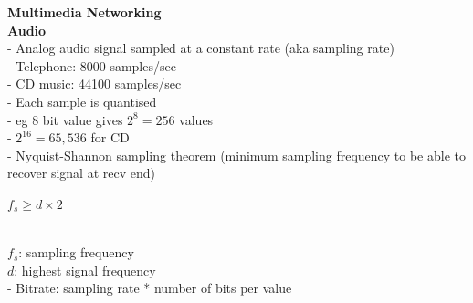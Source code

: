 \documentclass[10pt, a4paper]{article}
\newcommand{\tab}[0]{\hspace*{2mm}}
\begin{document}
\begin{multicols*}{3}
		{\normalsize\textbf{Multimedia Networking}}\\

		\textbf{Audio}\\
		- Analog audio signal sampled at a constant rate (aka sampling rate)\\
		\tab - Telephone: 8000 samples/sec\\
		\tab - CD music: 44100 samples/sec\\
		- Each sample is quantised\\
		\tab - eg 8 bit value gives $2^{8}=256$ values\\
		\tab - $2^{16} =65,536$ for CD\\
		- Nyquist-Shannon sampling theorem (minimum sampling frequency to be able to recover signal at recv end)\\
		\centerline{$f_{s} \geq d \times 2$}\\
		\tab $f_{s}$: sampling frequency\\
		\tab $d$: highest signal frequency\\
		- Bitrate: sampling rate * number of bits per value\\

















		

		
		
	\end{multicols*}
\end{document}
